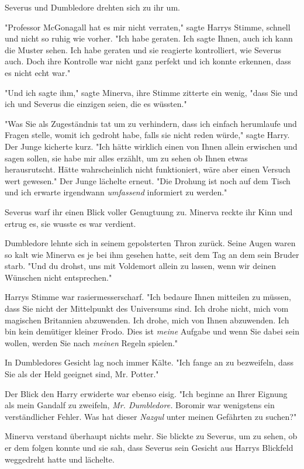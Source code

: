 {Severus und Dumbledore drehten sich zu ihr um.

"Professor McGonagall hat es mir nicht verraten," sagte Harrys Stimme, schnell und nicht so ruhig wie vorher. "Ich habe geraten. Ich sagte Ihnen, auch ich kann die Muster sehen. Ich habe geraten und sie reagierte kontrolliert, wie Severus auch. Doch ihre Kontrolle war nicht ganz perfekt und ich konnte erkennen, dass es nicht echt war."

"Und ich sagte ihm," sagte Minerva, ihre Stimme zitterte ein wenig, "dass Sie und ich und Severus die einzigen seien, die es wüssten."

"Was Sie als Zugeständnis tat um zu verhindern, dass ich einfach herumlaufe und Fragen stelle, womit ich gedroht habe, falls sie nicht reden würde," sagte Harry. Der Junge kicherte kurz. "Ich hätte wirklich einen von Ihnen allein erwischen und sagen sollen, sie habe mir alles erzählt, um zu sehen ob Ihnen etwas herausrutscht. Hätte wahrscheinlich nicht funktioniert, wäre aber einen Versuch wert gewesen." Der Junge lächelte erneut. "Die Drohung ist noch auf dem Tisch und ich erwarte irgendwann \emph{umfassend} informiert zu werden."

Severus warf ihr einen Blick voller Genugtuung zu. Minerva reckte ihr Kinn und ertrug es, sie wusste es war verdient.

Dumbledore lehnte sich in seinem gepolsterten Thron zurück. Seine Augen waren so kalt wie Minerva es je bei ihm gesehen hatte, seit dem Tag an dem sein Bruder starb. "Und du drohst, uns mit Voldemort allein zu lassen, wenn wir deinen Wünschen nicht entsprechen."

Harrys Stimme war rasiermesserscharf. "Ich bedaure Ihnen mitteilen zu müssen, dass Sie nicht der Mittelpunkt des Universums sind. Ich drohe nicht, mich vom magischen Britannien abzuwenden. Ich drohe, mich von Ihnen abzuwenden. Ich bin kein demütiger kleiner Frodo. Dies ist \emph{meine} Aufgabe und wenn Sie dabei sein wollen, werden Sie nach \emph{meinen} Regeln spielen."

In Dumbledores Gesicht lag noch immer Kälte. "Ich fange an zu bezweifeln, dass Sie als der Held geeignet sind, Mr. Potter."

Der Blick den Harry erwiderte war ebenso eisig. "Ich beginne an Ihrer Eignung als mein Gandalf zu zweifeln, \emph{Mr. Dumbledore.} Boromir war wenigstens ein verständlicher Fehler. Was hat dieser \emph{Nazgul} unter meinen Gefährten zu suchen?"

Minerva verstand überhaupt nichts mehr. Sie blickte zu Severus, um zu sehen, ob er dem folgen konnte und sie sah, dass Severus sein Gesicht aus Harrys Blickfeld weggedreht hatte und lächelte.

}
